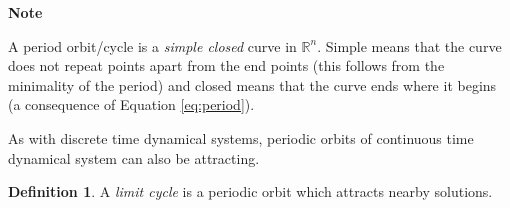 \documentclass[
  a4paper,
  oneside,
  final]{krantz}
\newcommand{\R}{\mathbb{R}}
\theoremstyle{definition}
\newtheorem{definition}{Definition}[chapter]
\theoremstyle{definition}
\theoremstyle{definition}
\theoremstyle{definition}
\theoremstyle{remark}
\begin{document}
\begin{palegreenbox}

\begin{center}
\textbf{Note}

\end{center}

A period orbit/cycle is a \emph{simple closed} curve in \(\R^{n}\). Simple means that the curve does not repeat points apart from the end points (this follows from the minimality of the period) and closed means that the curve ends where it begins (a consequence of Equation \eqref{eq:period}).

\end{palegreenbox}

As with discrete time dynamical systems, periodic orbits of continuous time dynamical system can also be attracting.

\begin{definition}
A \emph{limit cycle} is a periodic orbit which attracts nearby solutions.
\end{definition}
\end{document}

